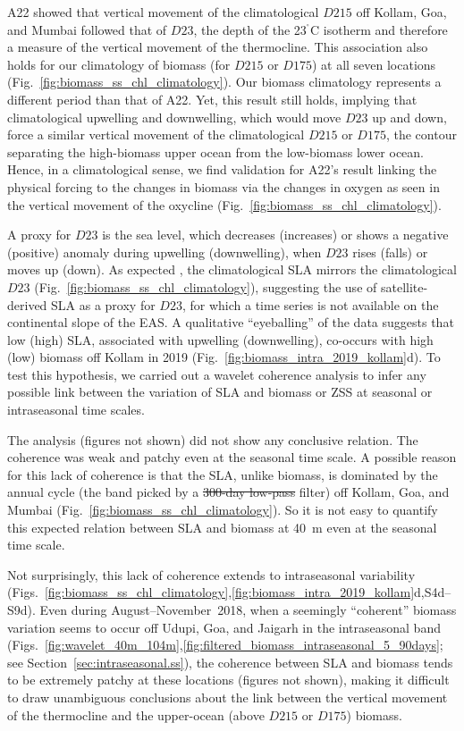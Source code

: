 \documentclass[authoryear,review,11pt]{elsarticle}
\newcommand{\cdigri}{{\ensuremath{^{^\circ}}\mathrm{C}}}
\providecommand{\DIFaddtex}[1]{{\protect\color{blue}\uwave{#1}}} %
\providecommand{\DIFdeltex}[1]{{\protect\color{red}\sout{#1}}}                      %
\providecommand{\DIFaddbegin}{} %
\providecommand{\DIFaddend}{} %
\providecommand{\DIFdelbegin}{} %
\providecommand{\DIFdelend}{} %
\providecommand{\DIFadd}[1]{\texorpdfstring{\DIFaddtex{#1}}{#1}} %
\providecommand{\DIFdel}[1]{\texorpdfstring{\DIFdeltex{#1}}{}} %
\begin{document}
A22 showed that vertical movement of the climatological $D215$ off Kollam, Goa, and Mumbai followed that of $D23$, the depth of the 23$\cdigri$ isotherm and therefore a measure of the vertical movement of the thermocline.  This association also holds for our climatology of biomass (for $D215$ or $D175$) at all seven locations (Fig.~\ref{fig:biomass_ss_chl_climatology}).  Our biomass climatology represents a different period than that of A22. Yet, this result still holds, implying that climatological upwelling and downwelling, which would move $D23$ up and down, force a similar vertical movement of the climatological $D215$ or $D175$, the contour separating the high-biomass upper ocean from the low-biomass lower ocean.  Hence, in a climatological sense, we find validation for A22's result linking the physical forcing to the changes in biomass via the changes in oxygen as seen in the vertical movement of the oxycline (Fig.~\ref{fig:biomass_ss_chl_climatology}).  

A proxy for $D23$ is the sea level, which decreases (increases) or shows a negative (positive) anomaly during upwelling (downwelling), when $D23$ rises (falls) or moves up (down). As expected \citep[see, for example,][]{shankar2000seasonal}, the climatological SLA mirrors the climatological $D23$ (Fig.~\ref{fig:biomass_ss_chl_climatology}), suggesting the use of satellite-derived SLA as a proxy for $D23$, for which a time series is not available on the continental slope of the EAS. A qualitative ``eyeballing'' of the data suggests that low (high) SLA, associated with upwelling (downwelling), co-occurs with high (low) biomass off Kollam in 2019 (Fig.~\ref{fig:biomass_intra_2019_kollam}d).  To test this hypothesis, we carried out a wavelet coherence analysis to infer any possible link between the variation of SLA and biomass or ZSS at seasonal or intraseasonal time scales.  

The analysis (figures not shown) did not show any conclusive relation. The coherence was weak and patchy even at the seasonal time scale. A possible reason for this lack of coherence is that the SLA, unlike biomass, is dominated by the annual cycle (the band picked by a \DIFdelbegin \DIFdel{300-day low-pass }\DIFdelend \DIFaddbegin \DIFadd{300--400~days band-pass }\DIFaddend filter) off Kollam, Goa, and Mumbai (Fig.~\ref{fig:biomass_ss_chl_climatology}). So it is not easy to quantify this expected relation between SLA and biomass at 40~m even at the seasonal time scale.

Not surprisingly, this lack of coherence extends to intraseasonal variability (Figs.~\ref{fig:biomass_ss_chl_climatology},\ref{fig:biomass_intra_2019_kollam}d,S4d--S9d).  Even during August--November~2018, when a seemingly ``coherent'' biomass variation seems to occur off Udupi, Goa, and Jaigarh in the intraseasonal band (Figs.~\ref{fig:wavelet_40m_104m},\ref{fig:filtered_biomass_intraseasonal_5_90days}; see Section~\ref{sec:intraseasonal.ss}), the coherence between SLA and biomass tends to be extremely patchy at these locations (figures not shown), making it difficult to draw unambiguous conclusions about the link between the vertical movement of the thermocline and the upper-ocean (above $D215$ or $D175$) biomass.
\end{document}
